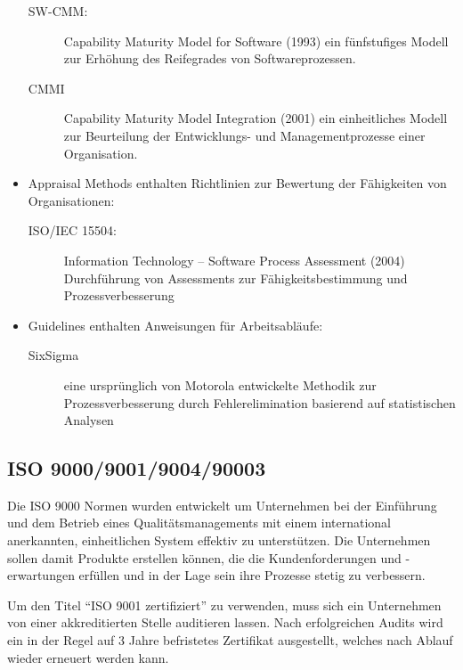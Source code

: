 \begin{itemize}
\begin{description}
\item[SW-CMM:] Capability Maturity Model for Software (1993) ein fünfstufiges Modell zur
  Er\-höh\-ung des Reifegrades von Softwareprozessen.
\item[CMMI] Capability Maturity Model Integration (2001) ein einheitliches
  Modell zur Beurteilung der Entwicklungs- und Managementprozesse einer
  Organisation.
\end{description}
%
\newslide
\item Appraisal Methods enthalten Richtlinien zur Bewertung der
  Fähigkeiten von Organisationen:
%
\begin{description}
\item[ISO/IEC 15504:] Information Technology -- Software Process Assessment
  (2004) Durch\-füh\-rung von Assessments zur Fähigkeitsbestimmung und
  Prozess\-ver\-bes\-se\-rung
\end{description}
%
\item Guidelines enthalten Anweisungen für Arbeitsabläufe:
\begin{description}
\item[SixSigma] eine ursprünglich von Motorola
  entwickelte Methodik zur Prozess\-ver\-bes\-se\-rung durch Fehlerelimination
  basierend auf statistischen Analysen
\end{description}
\end{itemize}
\newpage
\subsection{ISO 9000/9001/9004/90003}
Die ISO 9000 Normen wurden entwickelt um Unternehmen bei der Einführung
und dem Betrieb eines Qualitätsmanagements mit einem international
anerkannten, einheitlichen System effektiv zu unterstützen.
Die Unternehmen sollen damit Produkte erstellen kön\-nen,
die die Kundenforderungen und -erwartungen erfüllen und in
der Lage sein ihre Prozesse stetig
zu verbessern.

Um den Titel ``ISO 9001 zertifiziert'' zu verwenden, muss sich ein
Unternehmen von einer akkreditierten Stelle auditieren
lassen. Nach erfolgreichen Audits wird ein in der Regel
auf 3 Jahre befristetes
Zertifikat ausgestellt, welches nach Ablauf wieder erneuert werden kann.

